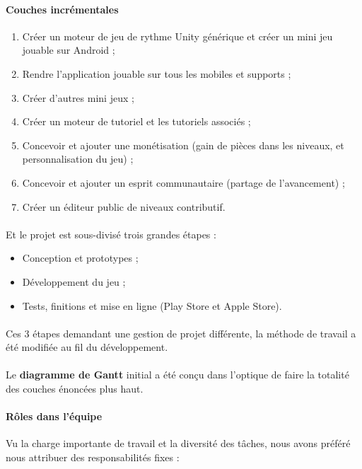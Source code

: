 \paragraph{Couches incrémentales}
\begin{enumerate}
\item Créer un moteur de jeu de rythme Unity générique et créer un mini jeu jouable sur Android ;
\item Rendre l’application jouable sur tous les mobiles et supports ;
\item Créer d’autres mini jeux ;
\item Créer un moteur de tutoriel et les tutoriels associés ;
\item Concevoir et ajouter une monétisation (gain de pièces dans les niveaux, et personnalisation du jeu) ;
\item Concevoir et ajouter un esprit communautaire (partage de l’avancement) ;
\item Créer un éditeur public de niveaux contributif.
\end{enumerate}

\paragraph{}
Et le projet est sous-divisé trois grandes étapes :
\begin{itemize}
\item Conception et prototypes ;
\item Développement du jeu ;
\item Tests, finitions et mise en ligne (Play Store et Apple Store).
\end{itemize}

\paragraph{}
Ces 3 étapes demandant une gestion de projet différente, la méthode de travail a été modifiée au fil du développement.

\paragraph{}
Le \textbf{diagramme de Gantt} initial a été conçu dans l’optique de faire la totalité des couches énoncées plus haut.



\paragraph{Rôles dans l’équipe}
Vu la charge importante de travail et la diversité des tâches, nous avons préféré nous attribuer des responsabilités fixes :

